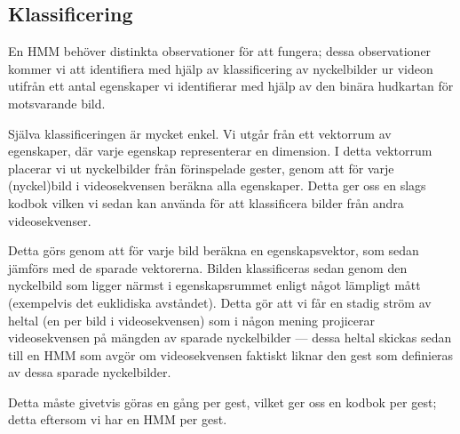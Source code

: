 \documentclass[../rapport_MVEX01-11-05]{subfiles}
\begin{document}
\subsection{Klassificering}
En HMM behöver distinkta observationer för att fungera; dessa
observationer kommer vi att identifiera med hjälp av klassificering av
nyckelbilder ur videon utifrån ett antal egenskaper vi identifierar
med hjälp av den binära hudkartan för motsvarande bild.

Själva klassificeringen är mycket enkel. Vi utgår från ett vektorrum
av egenskaper, där varje egenskap representerar en dimension. I detta
vektorrum placerar vi ut nyckelbilder från förinspelade gester, genom
att för varje (nyckel)bild i videosekvensen beräkna alla egenskaper.
Detta ger oss en slags kodbok vilken vi sedan kan använda för att
klassificera bilder från andra videosekvenser. 

Detta görs genom att för varje bild beräkna en egenskapsvektor, som
sedan jämförs med de sparade vektorerna. Bilden klassificeras sedan
genom den nyckelbild som ligger närmst i egenskapsrummet enligt något
lämpligt mått (exempelvis det euklidiska avståndet). Detta gör att vi
får en stadig ström av heltal (en per bild i videosekvensen) som i
någon mening projicerar videosekvensen på mängden av sparade
nyckelbilder --- dessa heltal skickas sedan till en HMM som avgör om
videosekvensen faktiskt liknar den gest som definieras av dessa
sparade nyckelbilder.

Detta måste givetvis göras en gång per gest, vilket ger oss en kodbok
per gest; detta eftersom vi har en HMM per gest.


\end{document}
